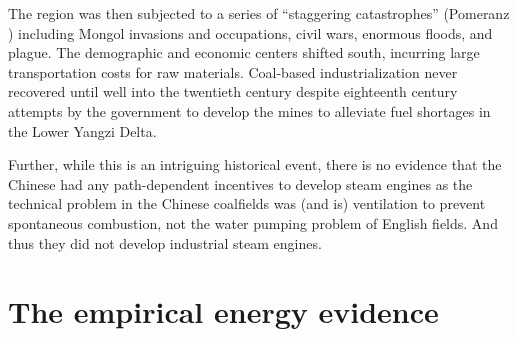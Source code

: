 \documentclass[12pt]{article}
\numberwithin{equation}{section}
\begin{document}
		The region was then subjected to a series of ``staggering catastrophes'' (Pomeranz \citeyear[p.~62]{pomeranz_great_2001}) including Mongol invasions and occupations, civil wars, enormous floods, and plague. The demographic and economic centers shifted south, incurring large transportation costs for raw materials. Coal-based industrialization never recovered until well into the twentieth century despite eighteenth century attempts by the government to develop the mines to alleviate fuel shortages in the Lower Yangzi Delta.
		
		Further, while this is an intriguing historical event, there is no evidence that the Chinese had any path-dependent incentives to develop steam engines as the technical problem in the Chinese coalfields was (and is) ventilation to prevent spontaneous combustion, not the water pumping problem of English fields. And thus they did not develop industrial steam engines.
		

	\section*{The empirical energy evidence}
	
\end{document}
